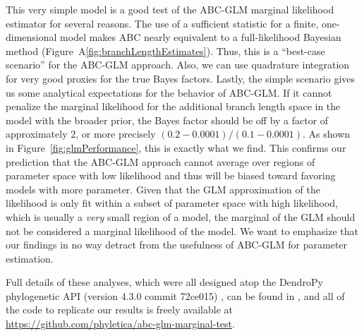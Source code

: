 This very simple model is a good test of the ABC-GLM marginal likelihood
estimator for several reasons.
The use of a sufficient statistic for a finite, one-dimensional model makes ABC
nearly equivalent to a full-likelihood Bayesian method
(Figure~A\ref{fig:branchLengthEstimates}).
Thus, this is a ``best-case scenario'' for the ABC-GLM approach.
Also, we can use quadrature integration for very good proxies for the true
Bayes factors.
Lastly, the simple scenario gives us some analytical expectations for the
behavior of ABC-GLM.
If it cannot penalize the marginal likelihood for the additional branch length
space in the model with the broader prior, the Bayes factor should be off by a
factor of approximately 2, or more precisely $(0.2-0.0001) / (0.1-0.0001)$.
As shown in Figure~\ref{fig:glmPerformance}, this is exactly what we find.
This confirms our prediction that the ABC-GLM approach cannot average over
regions of parameter space with low likelihood and thus will be biased toward
favoring models with more parameter.
Given that the GLM approximation of the likelihood is only fit within a subset
of parameter space with high likelihood, which is usually a \emph{very} small
region of a model, the marginal of the GLM should not be considered a marginal
likelihood of the model.
We want to emphasize that our findings in no way detract from the usefulness of
ABC-GLM for parameter estimation.

Full details of these analyses, which were all designed atop the DendroPy
phylogenetic API (version 4.3.0 commit 72ce015) \citep{Sukumaran2010}, can be
found in
,
and all of the code to replicate our
results is freely available at
\url{https://github.com/phyletica/abc-glm-marginal-test}.




